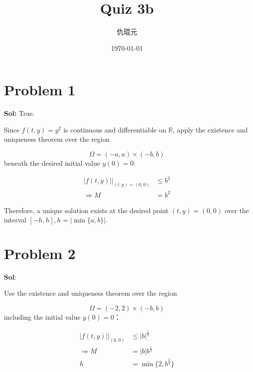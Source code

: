 \documentclass[utf8]{ctexart}
\begin{document}
\title{Quiz 3b }
\author{仇琨元}
\date{\today}
\maketitle

\section{Problem 1}

\textbf{Sol:}  True.

Since \(f(t,y)=y^{2}\) is continuous and differentiable on \(\mathbb{R}\), apply the existence and uniqueness theorem over the region

\begin{equation}
	\Omega=(-a,a)\times (-b,b)
\end{equation}
beneath the desired initial value \(y(0)=0\):

\begin{equation}
	\begin{aligned}
		\left.        \left|f(t,y)\right|\right|_{(t,y)=(0,0)} & \leq b^{2} \\
		\Rightarrow M                                          & =b^{2}
	\end{aligned}
\end{equation}

Therefore, a unique solution exists at the desired point \((t,y)=(0,0)\) over the interval \([-h,h],h=\left|\min \{a,b\}\right|\).

\section{Problem 2}

\textbf{Sol}:

Use the existence and uniqueness theorem over the region

\begin{equation}
	\Omega=(-2,2)\times (-b,b)
\end{equation}
including the initial value \(y(0)=0\)：

\begin{equation}
	\begin{aligned}
		\left.        \left|f(t,y)\right|\right|_{(0,0)} & \leq\left|b\right|^{\frac{1}{3}} \\
		\Rightarrow M                                    & =\left|b\right|b^{\frac{1}{3}}   \\
		h                                                & =\min \{2,b^{\frac{2}{3}}\}
	\end{aligned}
\end{equation}
\end{document}

